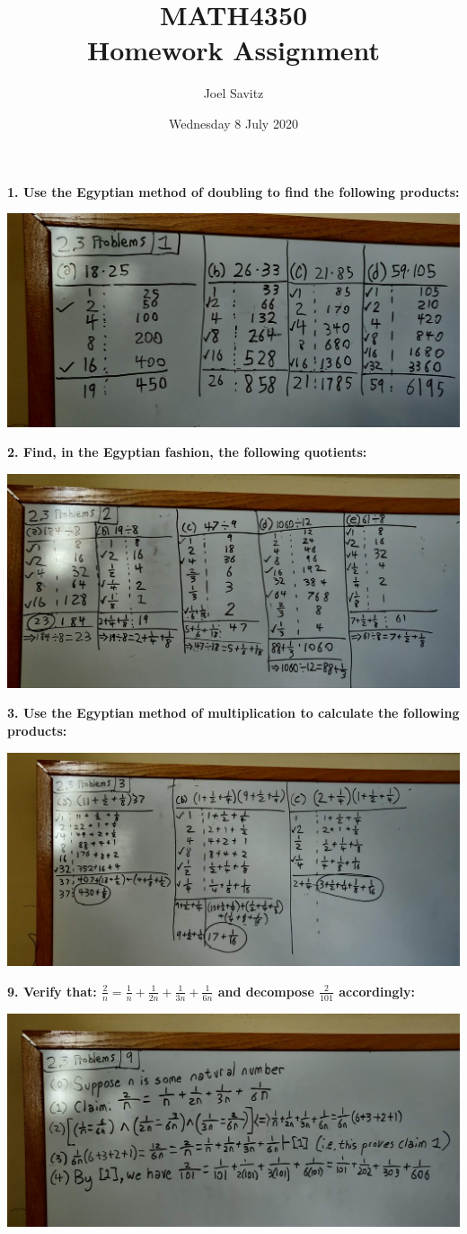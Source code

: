 \documentclass[12pt]{article}
\title{MATH4350 \\ Homework Assignment}
\author{Joel Savitz}
\date{Wednesday 8 July 2020}
\begin{document}
\maketitle

\textbf{1. Use the Egyptian method of doubling to find the following products:}
\medskip

\includegraphics[scale=0.08]{1.jpg}

\pagebreak
\textbf{2. Find, in the Egyptian fashion, the following quotients: }
\medskip

\includegraphics[angle=180, scale=0.08]{2.jpg}

\pagebreak
\textbf{3. Use the Egyptian method of multiplication to calculate the following products: }
\medskip

\includegraphics[scale=0.08]{3.jpg}

\pagebreak
\textbf{9. Verify that: $\frac{2}{n} = \frac{1}{n} + \frac{1}{2n} + \frac{1}{3n} + \frac{1}{6n}$
and decompose  $\frac{2}{101}$ accordingly:}
\medskip

\includegraphics[scale=0.08]{9.jpg}
\end{document}
